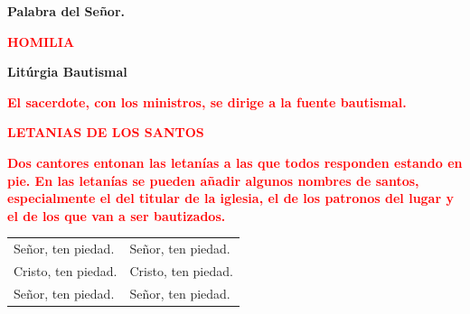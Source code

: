 \documentclass[12pt, letterpaper]{report}
\begin{document}
{\bfseries Palabra del Se\~nor.} \newline

\Large {\bfseries \textcolor{red}{HOMILIA}} \newline

\newpage

\begin{center}
\Huge {\bfseries Lit\'urgia Bautismal}
\end{center}

\vspace{1cm}

\large {\bfseries \textcolor{red}{El sacerdote, con los ministros, se dirige a la fuente bautismal.}} \newline

\Large {\bfseries \textcolor{red}{LETANIAS DE LOS SANTOS}} \newline

\large {\bfseries \textcolor{red}{Dos cantores entonan las letan\'ias a las que todos responden estando en pie. En las letan\'ias se pueden a\~nadir algunos nombres de santos, especialmente el del titular de la iglesia, el de los patronos del lugar y el de los que van a ser bautizados.}} \newline

\begin{tabular}{ll}
Se\~nor, ten piedad.& Se\~nor, ten piedad.\\
Cristo, ten piedad.& Cristo, ten piedad. \\
Se\~nor, ten piedad.& Se\~nor, ten piedad.
\end{tabular} \newline \\
\end{document}
